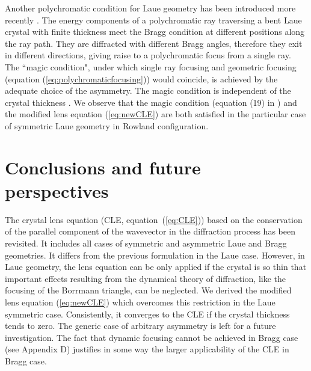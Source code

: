 \documentclass[preprint]{iucr}              %
\begin{document}
Another polychromatic condition for Laue geometry has been introduced more recently \cite{Martinson, PengQi, PengQi2021}.
The energy components of a polychromatic ray traversing a bent Laue crystal with finite thickness meet the Bragg condition at different positions along the ray path. They are diffracted with different Bragg angles, therefore they exit in different directions, giving raise to a polychromatic focus from a single ray. The ``magic condition", under which single ray focusing and geometric focusing (equation (\ref{eq:polychromaticfocusing})) would coincide, is achieved by the adequate choice of the asymmetry. The magic condition is independent of the crystal thickness \cite{PengQi2021}. We observe that the magic condition (equation (19) in \cite{PengQi2021}) and the modified lens equation (\ref{eq:newCLE}) are both satisfied in the particular case of symmetric Laue geometry in Rowland configuration.   

\section{Conclusions and future perspectives}
\label{sec:summary}

The crystal lens equation (CLE, equation~(\ref{eq:CLE})) based on the conservation of the parallel component of the wavevector in the diffraction process has been revisited. It includes all cases of symmetric and asymmetric Laue and Bragg geometries. It differs from the previous formulation \cite{CK} in the Laue case. However, in Laue geometry, the lens equation 
can be only applied if the crystal is so thin that important effects resulting from the dynamical theory of diffraction, like the focusing of the Borrmann triangle, can be neglected. We derived the modified lens equation (\ref{eq:newCLE}) which overcomes this restriction in the Laue symmetric case. Consistently, it converges to the CLE if the crystal thickness tends to zero. The generic case of arbitrary asymmetry is left for a future investigation.
The fact that dynamic focusing cannot be achieved in Bragg case (see Appendix D) justifies in some way the larger applicability of the CLE in Bragg case.
\end{document}
